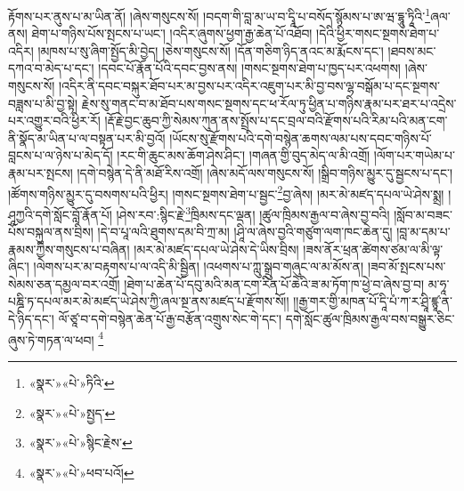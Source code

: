 རྟོགས་པར་ནུས་པ་མ་ཡིན་ནོ། །ཞེས་གསུངས་སོ། །བདག་གི་བླ་མ་ཡ་བ་དྭཱི་པ་བསོད་སྙོམས་པ་ཨ་ཝ་དྷཱུ་ཏཱིའི་\footnote{«སྣར་»«པེ་»ཏིའི་}ཞལ་ནས། ཐེག་པ་གཉིས་པོས་སྤངས་པ་ཡང་། །འདིར་ཞུགས་ཕྱག་རྒྱ་ཆེན་པོ་འཐོབ། །དེའི་ཕྱིར་གསང་སྔགས་ཐེག་པ་འདིར། །མཁས་པ་སུ་ཞིག་སྤྱོད་མི་བྱེད། །ཅེས་གསུངས་སོ། །དོན་གཅིག་ཉིད་ནའང་མ་རྨོངས་དང་། །ཐབས་མང་དཀའ་བ་མེད་པ་དང་། །དབང་པོ་རྣོན་པོའི་དབང་བྱས་ནས། །གསང་སྔགས་ཐེག་པ་ཁྱད་པར་འཕགས། །ཞེས་གསུངས་སོ། །འདིར་ནི་དབང་བསྐུར་ཐོབ་པར་མ་བྱས་པར་འདིར་འཇུག་པར་མི་བྱ་བས་ལྷ་བསྒོམ་པ་དང་སྔགས་བཟླས་པ་མི་བྱ་སྟེ། རྗེས་སུ་གནང་བ་མ་ཐོབ་པས་གསང་སྔགས་དང་ཕ་རོལ་ཏུ་ཕྱིན་པ་གཉིས་རྣམ་པར་ཐར་པ་འདྲེས་པར་འགྱུར་བའི་ཕྱིར་རོ། །རྡོ་རྗེ་བྱང་ཆུབ་ཀྱི་སེམས་ཀུན་ནས་སྤྲོས་པ་དང་བྲལ་བའི་རྫོགས་པའི་རིམ་པའི་མན་ངག་ནི་སྣོད་མ་ཡིན་པ་ལ་བསྟན་པར་མི་བྱའོ། །ཡོངས་སུ་རྫོགས་པའི་དགེ་བསྙེན་ཆགས་ལམ་པས་དབང་གཉིས་པོ་བླངས་པ་ལ་ཉེས་པ་མེད་དོ། །རང་གི་ཆུང་མས་ཆོག་ཤེས་ཤིང་། །གཞན་གྱི་བུད་མེད་ལ་མི་འགྲོ། །ལོག་པར་གཡེམ་པ་རྣམ་པར་སྤངས། །དགེ་བསྙེན་དེ་ནི་མཐོ་རིས་འགྲོ། །ཞེས་མདོ་ལས་གསུངས་སོ། །སྒྲིབ་གཉིས་མྱུར་དུ་སྦྱངས་པ་དང་། །ཚོགས་གཉིས་མྱུར་དུ་བསགས་པའི་ཕྱིར། །གསང་སྔགས་ཐེག་པ་སྦྱང་\footnote{«སྣར་»«པེ་»སྤྱད་}བྱ་ཞེས། །མར་མེ་མཛད་དཔལ་ཡེ་ཤེས་སྨྲ། །ཤཱཀྱའི་དགེ་སློང་བློ་རྣོན་པོ། །ཤེས་རབ་:སྙིང་རྗེ་\footnote{«སྣར་»«པེ་»སྙིང་རྗེས་}ཁྲིམས་དང་ལྡན། །ཚུལ་ཁྲིམས་རྒྱལ་བ་ཞེས་བྱ་བའི། །སློབ་མ་བཟང་པོས་བསྐུལ་ནས་བྲིས། །དེ་བ་པཱ་ལའི་ཐུགས་དམ་བི་ཀྲ་མ། །ཤཱི་ལ་ཞེས་བྱའི་གཙུག་ལག་ཁང་ཆེན་དུ། །བླ་མ་དམ་པ་རྣམས་ཀྱིས་གསུངས་པ་བཞིན། །མར་མེ་མཛད་དཔལ་ཡེ་ཤེས་དེ་ཡིས་བྲིས། །ཟས་ནོར་ཕྲན་ཚེགས་ཙམ་ལ་མི་ལྟ་ཞིང་། །ལེགས་པར་མ་བརྟགས་པ་ལ་འདི་མི་སྦྱིན། །འཕགས་པ་ཀླུ་སྒྲུབ་གཞུང་ལ་མ་མོས་ན། །ཟབ་མོ་སྤངས་པས་སེམས་ཅན་དམྱལ་བར་འགྲོ། །ཐེག་པ་ཆེན་པོ་དབུ་མའི་མན་ངག་རིན་པོ་ཆེའི་ཟ་མ་ཏོག་ཁ་ཕྱེ་བ་ཞེས་བྱ་བ། མ་ཧཱ་པཎྜི་ཏ་དཔལ་མར་མེ་མཛད་ཡེ་ཤེས་ཀྱི་ཞལ་སྔ་ནས་མཛད་པ་རྫོགས་སོ།། །།རྒྱ་གར་གྱི་མཁན་པོ་དཱི་པཾ་ཀ་ར་ཤྲཱི་ཛྙཱ་ན་དེ་ཉིད་དང་། ལོ་ཙཱ་བ་དགེ་བསྙེན་ཆེན་པོ་རྒྱ་བརྩོན་འགྲུས་སེང་གེ་དང་། དགེ་སློང་ཚུལ་ཁྲིམས་རྒྱལ་བས་བསྒྱུར་ཅིང་ཞུས་ཏེ་གཏན་ལ་ཕབ། \footnote{«སྣར་»«པེ་»ཕབ་པའོ། }